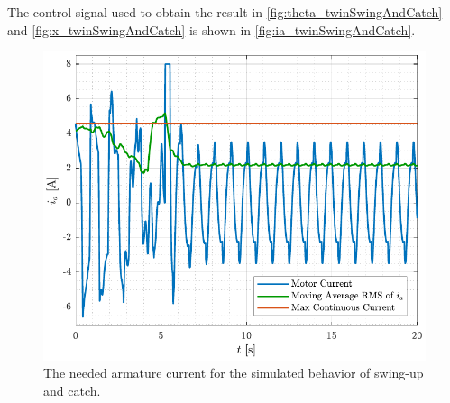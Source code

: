 %
The control signal used to obtain the result in \autoref{fig:theta_twinSwingAndCatch} and \ref{fig:x_twinSwingAndCatch} is shown in \autoref{fig:ia_twinSwingAndCatch}.
%
\begin{figure}[H]
  \includegraphics[width=.5\textwidth]{figures/ia_twinSwingAndCatch}
  \caption{The needed armature current for the simulated behavior of swing-up and catch.}
  \label{fig:ia_twinSwingAndCatch}
\end{figure}
%
%
%

